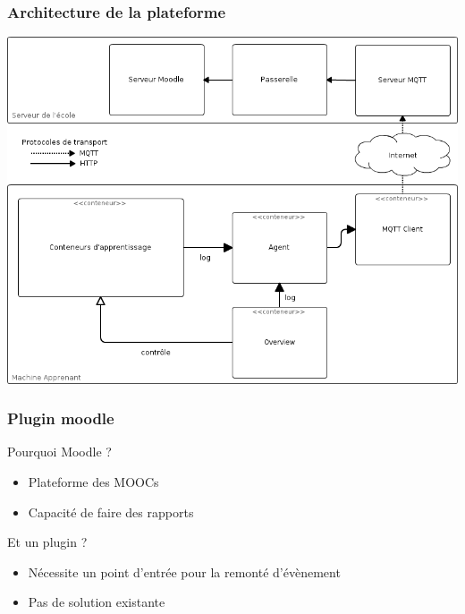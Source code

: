 \documentclass[10pt, compress]{beamer}
\begin{document}
\begin{frame}[fragile]
  \frametitle{Architecture de la plateforme}
  \begin{center}
  \includegraphics[scale = 0.32]{architecture.png}
   \end{center}
\end{frame}

\begin{frame}[fragile]
  \frametitle{Plugin moodle}
  Pourquoi Moodle ?
  \pause
  \begin{itemize}[<+- | alert@+>]
    \item Plateforme des MOOCs
    \item Capacité de faire des rapports
  \end{itemize}
  \pause
  Et un plugin ?
  \pause
  \begin{itemize}[<+- | alert@+>]
    \item Nécessite un point d'entrée pour la remonté d'évènement
    \item Pas de solution existante
  \end{itemize}
\end{frame}
\end{document}
